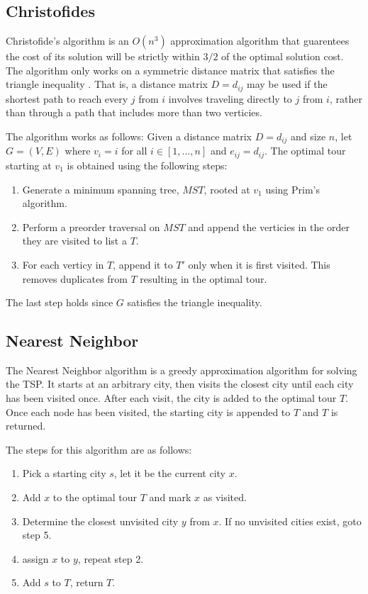 \documentclass[11pt,fleqn]{article}
\begin{document}
\subsection{Christofides}
Christofide's algorithm is an $O(n^3)$ approximation algorithm that guarentees
the cost of its solution will be strictly within $3/2$ of the optimal solution
cost.  The algorithm only works on a symmetric distance matrix that satisfies
the triangle inequality \cite{nicos}.  That is, a distance matrix $D=d_{ij}$
may be used if the shortest path to reach every $j$ from
$i$ involves traveling directly to $j$ from $i$, rather than through a path that
includes more than two verticies.
\par

The algorithm works as follows: Given a distance matrix $D=d_{ij}$ and size $n$,
let $G=(V,E)$ where $v_i=i$ for all $i\in [1,\dots,n]$ and $e_{ij}=d_{ij}$.  The
optimal tour starting at $v_1$ is obtained using the following steps:
\begin{enumerate}
  \item Generate a minimum spanning tree, $MST$, rooted at $v_1$ using Prim's algorithm.
  \item Perform a preorder traversal on $MST$ and append the verticies in the order they 
    are visited to list a $T$.
  \item For each verticy in $T$, append it to $T'$ only when it is first visited.  This 
    removes duplicates from $T$ resulting in the optimal tour.
\end{enumerate}

The last step holds since $G$ satisfies the triangle inequality.

\subsection{Nearest Neighbor}
The Nearest Neighbor algorithm is a greedy approximation algorithm
for solving the TSP\@.  It starts at an arbitrary city, then visits
the closest city until each city has been visited once.  After each
visit, the city is added to the optimal tour $T$.  Once each node
has been visited, the starting city is appended to $T$ and $T$ is
returned. \cite{bellmore}
\par

The steps for this algorithm are as follows:
\begin{enumerate}
  \item Pick a starting city $s$, let it be the current city $x$.
  \item Add $x$ to the optimal tour $T$ and mark $x$ as visited.
  \item Determine the closest unvisited city $y$ from $x$.  If no
    unvisited cities exist, goto step 5.
  \item assign $x$ to $y$, repeat step 2.
  \item Add $s$ to $T$, return $T$.
\end{enumerate}
\end{document}
